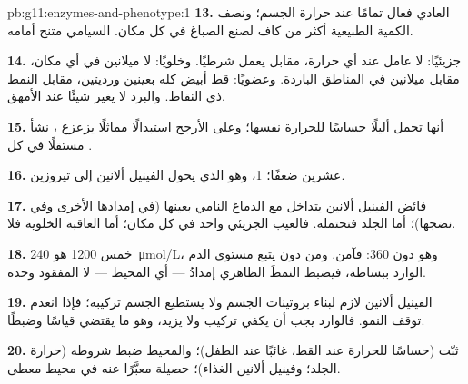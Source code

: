 \begin{solution}{pb:g11:enzymes-and-phenotype:1}
\textbf{13.}   العادي فعال تمامًا عند حرارة الجسم؛ ونصف
الكمية الطبيعية أكثر من كاف لصنع الصباغ في كل مكان.  السيامي
متنح أمامه.

\textbf{14.} جزيئيًا: لا  عامل عند أي حرارة، مقابل  يعمل
شرطيًا. وخلويًا: لا ميلانين في أي مكان، مقابل ميلانين في المناطق
الباردة. وعضويًا: قط أبيض كله بعينين ورديتين، مقابل النمط ذي النقاط.
والبرد لا يغير شيئًا عند الأمهق.

\textbf{15.} أنها تحمل أليلًا حساسًا للحرارة  نفسها؛ وعلى
الأرجح استبدالًا مماثلًا يزعزع ، نشأ مستقلًا في كل .

\textbf{16.} عشرين ضعفًا؛  1، وهو الذي يحول الفينيل ألانين إلى
تيروزين.

\textbf{17.} فائض الفينيل ألانين يتداخل مع  الدماغ النامي بعينها
(في إمدادها  الأخرى وفي نضجها)؛ أما  الجلد
فتحتمله. فالعيب الجزيئي واحد في كل مكان؛ أما العاقبة الخلوية فلا.

\textbf{18.} خمس \num{1200} هو \qty{240}{\micro mol/L}، وهو دون
\num{360}: فآمن. ومن دون  يتبع مستوى الدم الوارد ببساطة، فيضبط
النمطَ الظاهري إمدادُ  --- أي المحيط --- لا  المفقود
وحده.

\textbf{19.} الفينيل ألانين لازم لبناء بروتينات الجسم ولا يستطيع الجسم
تركيبه؛ فإذا انعدم توقف النمو. فالوارد يجب أن يكفي تركيب  ولا
يزيد، وهو ما يقتضي قياسًا وضبطًا.

\textbf{20.}  ثبّت  (حساسًا للحرارة عند القط،
غائبًا عند الطفل)؛ والمحيط ضبط شروطه (حرارة الجلد؛ وفينيل ألانين
الغذاء)؛  حصيلة  معبَّرًا عنه في محيط معطى.
\end{solution}
